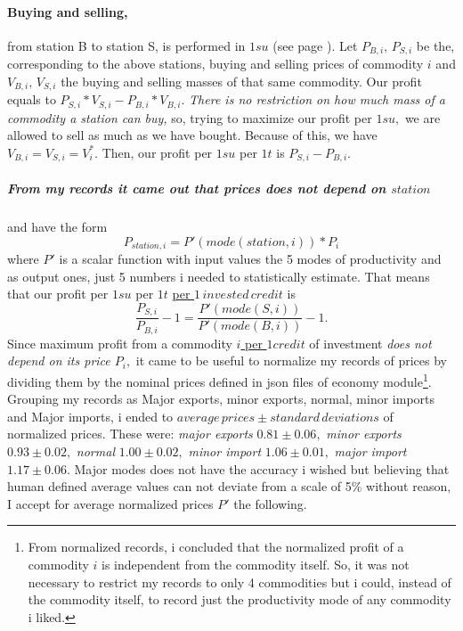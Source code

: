 \documentclass[]{article}
\begin{document}
\paragraph{Buying and selling,} from station B to station S, is performed in $1su$ (see page \pageref{standard_unit}). Let $P_{B,i},\,P_{S,i}$ be the, corresponding to the above stations, buying and selling prices of commodity $i$ and $V_{B,i},\,V_{S,i}$ the buying and selling masses of that same commodity. Our profit equals to $P_{S,i}*V_{S,i}-P_{B,i}*V_{B,i}.$ \emph{There is no restriction on how much mass of a commodity a station can buy,} so, trying to maximize our profit per $1su,$ we are allowed to sell as much as we have bought. Because of this, we have $V_{B,i}=V_{S,i}=V^{*}_{i}.$ Then, our profit per $1su$ per $1t$  is $P_{S,i}-P_{B,i}.$
\subparagraph*{From my records it came out that prices does not depend on $station$} and have the form \begin{equation}\label{eq:price_function_P'*P}
	P_{station,i}= P'(mode(station,i))*P_{i}
\end{equation}
\label{normalized_prices} where $P'$ is a scalar function with input values the 5 modes of productivity and as output ones, just 5 numbers i needed to statistically estimate. That means that our profit per $1su$ per $1t$ \underline{per $1\,invested\,credit$} is 
\begin{equation}\label{eq:profit_per_all}
	\dfrac{P_{S,i}}{P_{B,i}}-1=\dfrac{P'(mode(S,i))}{P'(mode(B,i))}-1.
\end{equation}
 Since maximum profit from a commodity $i$\underline{ per $1credit$} of investment \emph{does not depend on its price $P_{i},$} it came to be useful to normalize my records of prices by dividing them by the nominal prices defined in json files of economy module\footnote{From normalized records, i concluded that the normalized profit of a commodity $i$ is independent from the commodity itself. So, it was not necessary to restrict my records to only 4 commodities but i could, instead of the commodity itself, to record just the productivity mode of any commodity i liked.}. Grouping my records as Major exports, minor exports, normal, minor imports and Major imports, i ended to $average\, prices \pm standard\,deviations$ of normalized prices. These were: \emph{major exports} $0.81\pm0.06,$
	\emph{minor exports} $0.93\pm0.02,$
	\emph{normal} $1.00\pm0.02,$
	\emph{minor import} $1.06\pm0.01,$
	\emph{major import} $1.17\pm0.06.$
Major modes does not have the accuracy i wished but believing that human defined average values can not deviate from a scale of 5\% without reason, I accept for average normalized prices $P'$ the following. 
\end{document}
